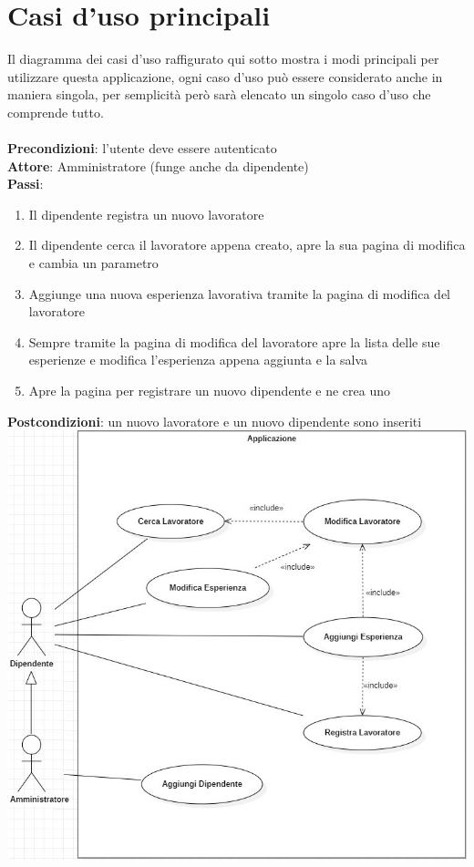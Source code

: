 \documentclass[ 4paper,11pt,openany]{book}
\begin{document}
\section{Casi d'uso principali}
Il diagramma dei casi d'uso raffigurato qui sotto mostra i modi principali per utilizzare questa applicazione, ogni caso d'uso può essere considerato anche in maniera singola, per semplicità però sarà elencato un singolo caso d'uso che comprende tutto.\\\\
\textbf{Precondizioni}: l'utente deve essere autenticato\\
\textbf{Attore}: Amministratore (funge anche da dipendente)\\
\textbf{Passi}:
\begin{enumerate}
\item Il dipendente registra un nuovo lavoratore
\item Il dipendente cerca il lavoratore appena creato, apre la sua pagina di modifica e cambia un parametro 
\item Aggiunge una nuova esperienza lavorativa tramite la pagina di modifica del lavoratore
\item Sempre tramite la pagina di modifica del lavoratore apre la lista delle sue esperienze e modifica l'esperienza appena aggiunta e la salva
\item Apre la pagina per registrare un nuovo dipendente e ne crea uno
\end{enumerate}
\textbf{Postcondizioni}: un nuovo lavoratore e un nuovo dipendente sono inseriti\\
\advance\leftskip-0.5cm
\includegraphics[width=180mm]{casi.jpg}
\end{document}
